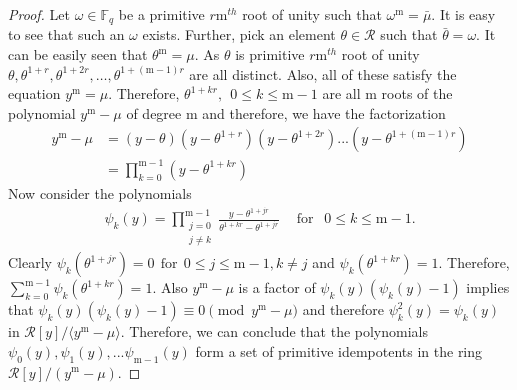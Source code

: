 \documentclass[12pt,a4paper]{article}
\begin{document}
\begin{proof}
Let $\omega \in \mathbb{F}_q$ be a primitive $r\mathrm{m}^{th}$ root of unity such that $\omega^{\mathrm{m}}=\bar{\mu}$. It is easy to see that such an $\omega$ exists. Further, pick an element $\theta \in \mathcal{R}$ such that $\bar{\theta}=\omega$. It can be easily seen that $\theta^{\mathrm{m}}=\mu$. As $\theta$ is primitive $r\mathrm{m}^{th}$ root of unity $\theta,\theta^{1+r},\theta^{1+2r}, \dots, \theta^{1+(\mathrm{m}-1)r}$ are all distinct. Also, all of these satisfy the equation $y^{\mathrm{m}}=\mu$. Therefore, $\theta^{1+kr},~~0\le k \le \mathrm{m}-1$ are all $\mathrm{m}$ roots of the polynomial $y^{\mathrm{m}}-\mu$ of degree $\mathrm{m}$ and therefore, we have the factorization
    \begin{align*}
        y^{\mathrm{m}}-\mu&= (y-\theta)(y-\theta^{1+r})(y-\theta^{1+2r})...(y-\theta^{1+(\mathrm{m}-1)r})\\
                 &=\prod_{k=0}^{\mathrm{m}-1} (y-\theta^{1+kr})
    \end{align*}
Now consider the polynomials
\begin{equation*}
    \begin{aligned}
        \psi_k(y)= \prod_{\substack{j=0\\ j\ne k}}^{\mathrm{m}-1} \frac{y - \theta^{1+jr}}{\theta^{1+kr} - \theta^{1+jr}}~~~~ \text{ for } ~~ 0 \le k \le \mathrm{m} - 1.
\end{aligned}
\end{equation*}
Clearly $\psi_k(\theta^{1+jr})=0 ~~\text{for}~~ 0 \le j \le \mathrm{m}-1, k\ne j$ and $\psi_k(\theta^{1+kr})=1$. Therefore, $\sum_{k=0}^{\mathrm{m} - 1} \psi_k(\theta^{1+kr}) = 1$. Also $y^{\mathrm{m}}-\mu$ is a factor of $\psi_k(y)(\psi_k(y) - 1)$ implies that $\psi_k(y)(\psi_k(y) - 1)\equiv0 \pmod{y^{\mathrm{m}}-\mu}$ and therefore $\psi_k^2(y) = \psi_k(y)$ in $\mathcal{R}[y]/ \langle y^{\mathrm{m}}-\mu \rangle$. Therefore, we can conclude that the polynomials $\psi_0(y),\psi_1(y),...\psi_{\mathrm{m}-1}(y)$ form a set of primitive idempotents in the ring $\mathcal{R}[y]/(y^{\mathrm{m}}-\mu)$.
\end{proof}
\end{document}
